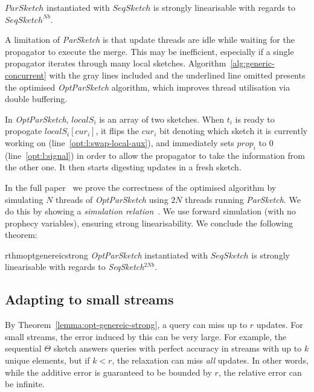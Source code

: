 \begin{lemma}
    $ParSketch$ instantiated with $SeqSketch$ is strongly linearisable with regards to $SeqSketch^{Nb}$.
    \label{lemma:genereic-strong}
\end{lemma}


A limitation of \emph{ParSketch} is that update threads are idle while waiting for the propagator to execute the merge. This
may be inefficient, especially if a single propagator iterates through many local sketches.
Algorithm~\ref{alg:generic-concurrent} with the gray lines included and the underlined line omitted presents
the optimised \emph{OptParSketch} algorithm, which improves thread utilisation via
double buffering.

In \emph{OptParSketch}, $localS_i$ is an array of two sketches. When $t_i$ is ready to propogate $localS_i[cur_i]$, it
flips the $cur_i$ bit denoting which sketch it is currently working on (line~\ref{opt:l:swap-local-aux}), 
and immediately sets $prop_i$ to 0 (line~\ref{opt:l:signal}) in order to allow the propagator to
take the information from the other one. It then starts digesting updates in a fresh sketch.

In the full paper~\cite{rinberg2019fast}
we prove the correctness of the optimised
algorithm by simulating $N$ threads of \emph{OptParSketch}
using $2N$ threads running \emph{ParSketch}. We do this by showing
a \emph{simulation relation}~\cite{lynch1996distributed}. We use forward simulation (with
no prophecy variables), ensuring strong linearisability. We conclude the following theorem:
\begin{restatable}{rthm}{optgenereicstrong}
    \emph{OptParSketch} instantiated with $SeqSketch$ is strongly linearisable with regards to \emph{SeqSketch}$^{2Nb}$.
    \label{lemma:opt-genereic-strong}
\end{restatable}

\subsection{Adapting to small streams}
\label{ssec:small-streams}

By Theorem~\ref{lemma:opt-genereic-strong}, a query can miss up to $r$ updates. For small
streams, the error induced by this can be very large.
For example, the sequential $\Theta$ sketch answers queries with perfect accuracy in streams with
up to $k$ unique elements, but if $k<r$, the relaxation can miss \emph{all} updates.
In other words, while the additive error is guaranteed to be bounded by $r$, the relative 
error can be infinite.  

